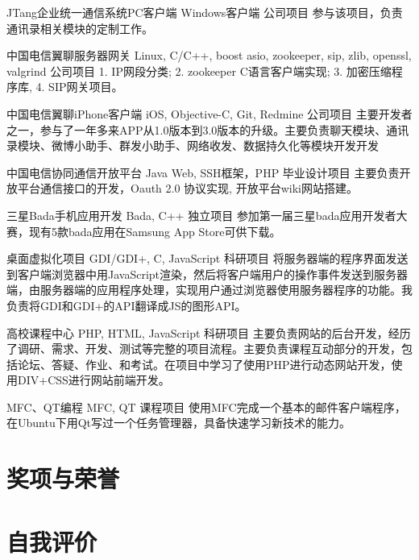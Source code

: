 \documentclass[11pt,a4paper]{moderncv}
\begin{document}
\vspace*{0.2\baselineskip}
{JTang企业统一通信系统PC客户端}
{Windows客户端}
{公司项目}{}
{参与该项目，负责通讯录相关模块的定制工作。}

\vspace*{0.2\baselineskip}
{中国电信翼聊服务器网关}
{Linux, C/C++, boost asio, zookeeper, sip, zlib, openssl, valgrind}
{公司项目}{}
{1. IP网段分类; 2. zookeeper C语言客户端实现; 3. 加密压缩程序库, 4. SIP网关项目。}

\vspace*{0.2\baselineskip}
{中国电信翼聊iPhone客户端}
{iOS, Objective-C, Git, Redmine}
{公司项目}{}
{主要开发者之一，参与了一年多来APP从1.0版本到3.0版本的升级。主要负责聊天模块、通讯录模块、微博小助手、群发小助手、网络收发、数据持久化等模块开发开发}

\vspace*{0.2\baselineskip}
{中国电信协同通信开放平台}
{Java Web, SSH框架，PHP}
{毕业设计项目}{}
{主要负责开放平台通信接口的开发，Oauth 2.0 协议实现, 开放平台wiki网站搭建。}

\vspace*{0.2\baselineskip}
{三星Bada手机应用开发}
{Bada, C++}
{独立项目}{}
{参加第一届三星bada应用开发者大赛，现有5款bada应用在Samsung App Store可供下载。}

\vspace*{0.2\baselineskip}
{桌面虚拟化项目}
{GDI/GDI+, C, JavaScript}
{科研项目}{}
{将服务器端的程序界面发送到客户端浏览器中用JavaScript渲染，然后将客户端用户的操作事件发送到服务器端，由服务器端的应用程序处理，实现用户通过浏览器使用服务器程序的功能。我负责将GDI和GDI+的API翻译成JS的图形API。}

\vspace*{0.2\baselineskip}
{高校课程中心}
{PHP, HTML, JavaScript}
{科研项目}{}
{主要负责网站的后台开发，经历了调研、需求、开发、测试等完整的项目流程。主要负责课程互动部分的开发，包括论坛、答疑、作业、和考试。在项目中学习了使用PHP进行动态网站开发，使用DIV+CSS进行网站前端开发。}

\vspace*{0.2\baselineskip}
\cventry{}
{MFC、QT编程}
{MFC, QT}
{课程项目}{}
{使用MFC完成一个基本的邮件客户端程序，在Ubuntu下用Qt写过一个任务管理器，具备快速学习新技术的能力。}

\renewcommand{\baselinestretch}{1.0}

\section{奖项与荣誉}

\section{自我评价}

\closesection{}                   %
\renewcommand{\listitemsymbol}{-} %
\end{document}

